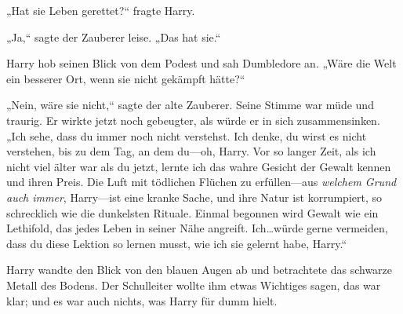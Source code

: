 „Hat sie Leben gerettet?“ fragte Harry.

„Ja,“ sagte der Zauberer leise. „Das hat sie.“

Harry hob seinen Blick von dem Podest und sah Dumbledore an. „Wäre die Welt ein besserer Ort, wenn sie nicht gekämpft hätte?“

„Nein, wäre sie nicht,“ sagte der alte Zauberer. Seine Stimme war müde und traurig. Er wirkte jetzt noch gebeugter, als würde er in sich zusammensinken. „Ich sehe, dass du immer noch nicht verstehst. Ich denke, du wirst es nicht verstehen, bis zu dem Tag, an dem du—oh, Harry. Vor so langer Zeit, als ich nicht viel älter war als du jetzt, lernte ich das wahre Gesicht der Gewalt kennen und ihren Preis. Die Luft mit tödlichen Flüchen zu erfüllen—aus \emph{welchem Grund auch immer}, Harry—ist eine kranke Sache, und ihre Natur ist korrumpiert, so schrecklich wie die dunkelsten Rituale. Einmal begonnen wird Gewalt wie ein Lethifold, das jedes Leben in seiner Nähe angreift. Ich…würde gerne vermeiden, dass du diese Lektion so lernen musst, wie ich sie gelernt habe, Harry.“

Harry wandte den Blick von den blauen Augen ab und betrachtete das schwarze Metall des Bodens. Der Schulleiter wollte ihm etwas Wichtiges sagen, das war klar; und es war auch nichts, was Harry für dumm hielt.

